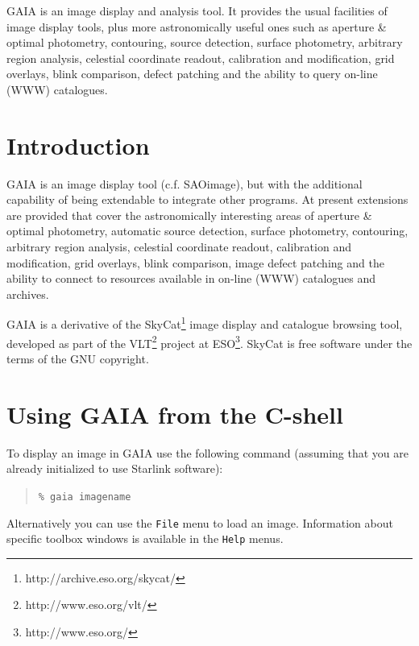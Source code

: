 \documentclass[twoside,11pt]{article}
\newcommand{\stardocinitials}  {SUN}
\newcommand{\stardocnumber}    {214.8}
\newcommand{\stardocabstract} {GAIA is an image display and analysis
tool. It provides the usual facilities of image display tools, plus
more astronomically useful ones such as aperture \& optimal
photometry, contouring, source detection, surface photometry,
arbitrary region analysis, celestial coordinate readout, calibration
and modification, grid overlays, blink comparison, defect patching and
the ability to query on-line (WWW) catalogues.}
\newcommand{\stardocname}{\stardocinitials /\stardocnumber}
\newcommand{\htmladdnormallinkfoot}[2]{#1\footnote{#2}}
\newenvironment{latexonly}{}{}
\newcommand{\xlabel}[1]{}
\renewcommand{\_}{\texttt{\symbol{95}}}
\newcommand{\mytt}[1]{{\texttt{#1}}}
\renewcommand{\thepage}{\roman{page}}
\begin{document}
\stardocabstract
  \newpage
  \begin{latexonly}
    \setlength{\parskip}{0mm}
    \tableofcontents
    \setlength{\parskip}{\medskipamount}
    \markboth{\stardocname}{\stardocname}
  \end{latexonly}
\cleardoublepage
\renewcommand{\thepage}{\arabic{page}}
\setcounter{page}{1}


\section{Introduction\xlabel{introduction}\label{introduction}}

GAIA is an image display tool (c.f. SAOimage), but with the additional
capability of being extendable to integrate other programs.  At
present extensions are provided that cover the astronomically
interesting areas of aperture \& optimal photometry, automatic source
detection, surface photometry, contouring, arbitrary region analysis,
celestial coordinate readout, calibration and modification, grid
overlays, blink comparison, image defect patching and the ability to
connect to resources available in on-line (WWW) catalogues and
archives.

GAIA is a derivative of the
\htmladdnormallinkfoot{SkyCat}{http://archive.eso.org/skycat/} image
display and catalogue browsing tool, developed as part of the
\htmladdnormallinkfoot{VLT}{http://www.eso.org/vlt/} project at
\htmladdnormallinkfoot{ESO}{http://www.eso.org/}. SkyCat is free software
under the terms of the GNU copyright.

\section{\xlabel{using_gaia_from_the_cshell}Using GAIA from the C-shell}

To display an image in GAIA use the following command
(assuming that you are already initialized to use Starlink software):
\begin{quote}
\mytt{\% gaia image\_name}
\end{quote}
Alternatively you can use the \mytt{File} menu to load an image.
Information about specific toolbox windows is available in the
\mytt{Help} menus.
\end{document}
